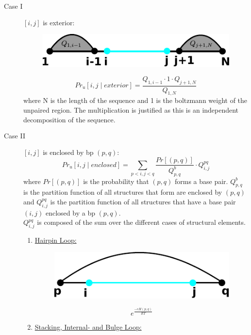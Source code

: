 \documentclass[11pt,a4paper]{report}
\begin{document}
\begin{description}
\item[Case I] $[i,j]$ is exterior:\\
\begin{figure}[H]
\centering
\includegraphics[scale=0.75]{UNO.pdf}
\end{figure}
\begin{equation*}
Pr_u[i,j\mid exterior] = \frac{Q_{1,i-1}\cdot 1 \cdot Q_{j+1,N}}{Q_{1,N}}
\end{equation*}
where N is the length of the sequence and 1 is the boltzmann weight of the unpaired region.
The multiplication is justified as this is an independent decomposition of the sequence.\\ 
\item[Case II] $[i,j]$ is enclosed by bp $(p,q)$:\\
\begin{equation*}
Pr_u[i,j\mid enclosed] = \sum\limits_{p<i,j<q} \frac{Pr[(p,q)]}{Q_{p,q}^b} \cdot Q_{i,j}^{pq}
\end{equation*}
where $Pr[(p,q)]$ is the probability that $(p,q)$ forms a base pair. $Q_{p,q}^b$ is the partition function of all structures that form are enclosed by $(p,q)$ and $Q_{i,j}^{pq}$ is the partition function of all structures that have a base pair $(i,j)$ enclosed by a bp $(p,q)$.\\
$Q_{i,j}^{pq}$ is composed of the sum over the different cases of structural elements.\\
\begin{enumerate}
\item \underline{Hairpin Loop:}\\
\begin{figure}[H]
\centering
\includegraphics[scale=0.75]{UHPL.pdf}
\end{figure}
\begin{equation*}
e^\frac{-eH(p,q)}{RT}
\end{equation*}
\item \underline{Stacking, Internal- and Bulge Loop:}\\

\end{enumerate}
\end{description}
\end{document}
